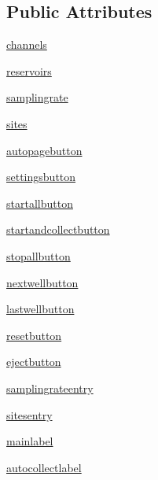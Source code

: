 \subsection*{Public Attributes}
\begin{DoxyCompactItemize}
\item 
\mbox{\hyperlink{class_g_u_i_1_1_manual_page_a81b94d5721f909a8c14888907d2ce4fe}{channels}}
\item 
\mbox{\hyperlink{class_g_u_i_1_1_manual_page_a8555c34c8bdcc975ff052c36cc309921}{reservoirs}}
\item 
\mbox{\hyperlink{class_g_u_i_1_1_manual_page_ae5e98e67c7a343d823fa512c2a4083e6}{samplingrate}}
\item 
\mbox{\hyperlink{class_g_u_i_1_1_manual_page_adaed6e62dc70abebd6a2016633c1ef5b}{sites}}
\item 
\mbox{\hyperlink{class_g_u_i_1_1_manual_page_adec327f6ec4e8c17378376ebf99cf0e2}{autopagebutton}}
\item 
\mbox{\hyperlink{class_g_u_i_1_1_manual_page_aface3d80161cf81b2cd2d586527bc9a2}{settingsbutton}}
\item 
\mbox{\hyperlink{class_g_u_i_1_1_manual_page_aa1e08b154b3ec4ada5bc9d7327e23f4c}{startallbutton}}
\item 
\mbox{\hyperlink{class_g_u_i_1_1_manual_page_a89d11a0a301940bac985baac9e6e197c}{startandcollectbutton}}
\item 
\mbox{\hyperlink{class_g_u_i_1_1_manual_page_ad4276bdf3965d48dea53674218e19999}{stopallbutton}}
\item 
\mbox{\hyperlink{class_g_u_i_1_1_manual_page_a57fafae1e707e59ebbd1219249e390f0}{nextwellbutton}}
\item 
\mbox{\hyperlink{class_g_u_i_1_1_manual_page_a61341806cbf2cc7dabf64d98e4cff069}{lastwellbutton}}
\item 
\mbox{\hyperlink{class_g_u_i_1_1_manual_page_a3b9289e6bfbb2c6c01383ddbbda38c9b}{resetbutton}}
\item 
\mbox{\hyperlink{class_g_u_i_1_1_manual_page_a34935bb792c0da28869377ffc88714eb}{ejectbutton}}
\item 
\mbox{\hyperlink{class_g_u_i_1_1_manual_page_ad0a53d6de20ebb42b3173ad37b8e858d}{samplingrateentry}}
\item 
\mbox{\hyperlink{class_g_u_i_1_1_manual_page_aa344022e47bac51b67ba51f189ebf006}{sitesentry}}
\item 
\mbox{\hyperlink{class_g_u_i_1_1_manual_page_a899bfbd2387e36a79f49e66895a062fb}{mainlabel}}
\item 
\mbox{\hyperlink{class_g_u_i_1_1_manual_page_a4f62f9cd9b897df513e1fc8818218f35}{autocollectlabel}}

\end{DoxyCompactItemize}
